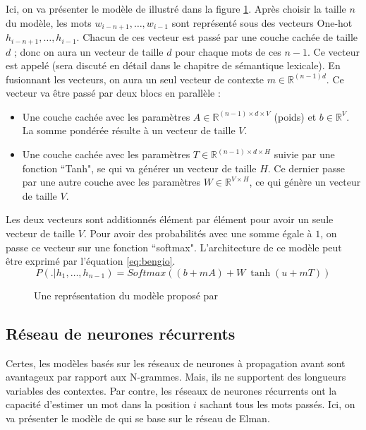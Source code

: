 \documentclass{KodeBook}
\begin{document}
Ici, on va présenter le  modèle de \cite{2003-bengio-al} illustré dans la figure \ref{fig:bengio-l}.
Après choisir la taille $n$ du modèle, les mots $w_{i-n+1}, \ldots, w_{i-1}$ sont représenté sous des vecteurs One-hot $h_{i-n+1}, \ldots, h_{i-1}$. 
Chacun de ces vecteur est passé par une couche cachée de taille $d$ ; donc on aura un vecteur de taille $d$ pour chaque mots de ces $n-1$.
Ce vecteur est appelé  (sera discuté en détail dans le chapitre de sémantique lexicale). 
En fusionnant les vecteurs, on aura un seul vecteur de contexte $m \in \mathbb{R}^{(n-1) d}$.
Ce vecteur va être passé par deux blocs en parallèle :
\begin{itemize}
	\item Une couche cachée avec les paramètres $A \in \mathbb{R}^{(n-1) \times d \times V}$ (poids) et $b \in \mathbb{R}^{V}$. 
	La somme pondérée résulte à un vecteur de taille $V$. 
	\item Une couche cachée avec les paramètres $T \in \mathbb{R}^{(n-1) \times d \times H}$ suivie par une fonction ``Tanh", se qui va générer un vecteur de taille $H$. 
	Ce dernier passe par une autre couche avec les paramètres $W \in \mathbb{R}^{V \times H}$, ce qui génère un vecteur de taille $V$. 
\end{itemize}
Les deux vecteurs sont additionnés élément par élément pour avoir un seule vecteur de taille $V$. 
Pour avoir des probabilités avec une somme égale à $1$, on passe ce vecteur sur une fonction ``softmax". 
L'architecture de ce modèle peut être exprimé par l'équation \ref{eq:bengio}.
\begin{equation}
	P(.|h_1,\ldots, h_{n-1}) = 
	Softmax \left(
	(b + m A) 
	+ 
	W\ \tanh(u + m T)
	\right)
	\label{eq:bengio}
\end{equation}

\begin{figure}[ht]
	\centering
	\caption{Une représentation du modèle proposé par \cite{2003-bengio-al}\label{fig:bengio-l}}
\end{figure}

\subsection{Réseau de neurones récurrents}

Certes, les modèles basés sur les réseaux de neurones à propagation avant sont avantageux par rapport aux N-grammes.
Mais, ils ne supportent des longueurs variables des contextes.
Par contre, les réseaux de neurones récurrents ont la capacité d'estimer un mot dans la position $i$ sachant tous les mots passés.
Ici, on va présenter le modèle de \cite{2010-mokolov-al} qui se base sur le réseau de Elman.
\end{document}
